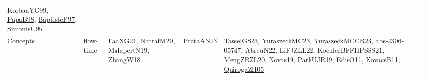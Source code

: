 {\begin{longtable}{lp{3cm}>{\raggedright}p{6cm}>{\raggedright}p{6cm}p{8cm}}
\href{papers/KorbaaYG99.pdf}{KorbaaYG99}\cite{KorbaaYG99}, \href{articles/PapaB98.pdf}{PapaB98}\cite{PapaB98}, \href{papers/BaptisteP97.pdf}{BaptisteP97}\cite{BaptisteP97}, \href{papers/SimonisC95.pdf}{SimonisC95}\cite{SimonisC95}\\
Concepts & flow-time & \href{articles/FanXG21.pdf}{FanXG21}\cite{FanXG21}, \href{papers/NattafM20.pdf}{NattafM20}\cite{NattafM20}, \href{papers/MalapertN19.pdf}{MalapertN19}\cite{MalapertN19}, \href{articles/ZhangW18.pdf}{ZhangW18}\cite{ZhangW18} & \href{articles/PrataAN23.pdf}{PrataAN23}\cite{PrataAN23} & \href{papers/TasselGS23.pdf}{TasselGS23}\cite{TasselGS23}, \href{papers/YuraszeckMC23.pdf}{YuraszeckMC23}\cite{YuraszeckMC23}, \href{articles/YuraszeckMCCR23.pdf}{YuraszeckMCCR23}\cite{YuraszeckMCCR23}, \href{articles/abs-2306-05747.pdf}{abs-2306-05747}\cite{abs-2306-05747}, \href{articles/AbreuN22.pdf}{AbreuN22}\cite{AbreuN22}, \href{papers/LiFJZLL22.pdf}{LiFJZLL22}\cite{LiFJZLL22}, \href{articles/KoehlerBFFHPSSS21.pdf}{KoehlerBFFHPSSS21}\cite{KoehlerBFFHPSSS21}, \href{articles/MengZRZL20.pdf}{MengZRZL20}\cite{MengZRZL20}, \href{articles/Novas19.pdf}{Novas19}\cite{Novas19}, \href{papers/ParkUJR19.pdf}{ParkUJR19}\cite{ParkUJR19}, \href{papers/EdisO11.pdf}{EdisO11}\cite{EdisO11}, \href{articles/KovacsB11.pdf}{KovacsB11}\cite{KovacsB11}, \href{papers/QuirogaZH05.pdf}{QuirogaZH05}\cite{QuirogaZH05}\\

\end{longtable}}
